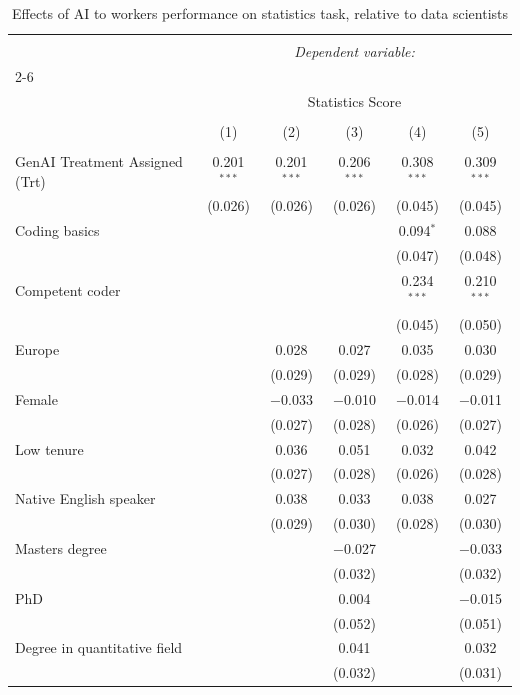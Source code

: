 
\begin{table}[!htbp] \centering 
  \caption{Effects of AI to workers performance on statistics task, relative to data scientists} 
  \label{tab:robust_stats} 
\small 
\begin{tabular}{@{\extracolsep{-5pt}}lccccc} 
\\[-1.8ex]\hline 
\hline \\[-1.8ex] 
 & \multicolumn{5}{c}{\textit{Dependent variable:}} \\ 
\cline{2-6} 
\\[-1.8ex] & \multicolumn{5}{c}{Statistics Score} \\ 
\\[-1.8ex] & (1) & (2) & (3) & (4) & (5)\\ 
\hline \\[-1.8ex] 
 GenAI Treatment Assigned (Trt) & 0.201$^{***}$ & 0.201$^{***}$ & 0.206$^{***}$ & 0.308$^{***}$ & 0.309$^{***}$ \\ 
  & (0.026) & (0.026) & (0.026) & (0.045) & (0.045) \\ 
  Coding basics &  &  &  & 0.094$^{*}$ & 0.088 \\ 
  &  &  &  & (0.047) & (0.048) \\ 
  Competent coder &  &  &  & 0.234$^{***}$ & 0.210$^{***}$ \\ 
  &  &  &  & (0.045) & (0.050) \\ 
  Europe &  & 0.028 & 0.027 & 0.035 & 0.030 \\ 
  &  & (0.029) & (0.029) & (0.028) & (0.029) \\ 
  Female &  & $-$0.033 & $-$0.010 & $-$0.014 & $-$0.011 \\ 
  &  & (0.027) & (0.028) & (0.026) & (0.027) \\ 
  Low tenure &  & 0.036 & 0.051 & 0.032 & 0.042 \\ 
  &  & (0.027) & (0.028) & (0.026) & (0.028) \\ 
  Native English speaker &  & 0.038 & 0.033 & 0.038 & 0.027 \\ 
  &  & (0.029) & (0.030) & (0.028) & (0.030) \\ 
  Masters degree &  &  & $-$0.027 &  & $-$0.033 \\ 
  &  &  & (0.032) &  & (0.032) \\ 
  PhD &  &  & 0.004 &  & $-$0.015 \\ 
  &  &  & (0.052) &  & (0.051) \\ 
  Degree in quantitative field &  &  & 0.041 &  & 0.032 \\ 
  &  &  & (0.032) &  & (0.031) \\ 

\end{tabular}
\end{table}
